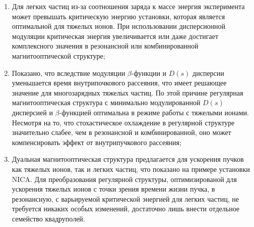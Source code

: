 \begin{enumerate}

\item  Для легких частиц из-за соотношения заряда к массе энергия эксперимента может превышать критическую энергию установки, которая является оптимальной для тяжелых ионов. При использовании дисперсионной модуляции критическая энергия увеличивается или даже достигает комплексного значения в резонансной или комбинированной магнитооптической структуре;

\item Показано, что вследствие модуляции $\beta$-функции и $D(s)$ дисперсии уменьшается время внутрипочкового рассеяния, что имеет решающее значение для многозарядных тяжелых частиц. По этой причине регулярная магнитооптическая структура с минимально модулированной $D(s)$ дисперсией и $\beta$-функцией оптимальна в режиме работы с тяжелыми ионами. Несмотря на то, что стохастическое охлаждение в регулярной структуре значительно слабее, чем в резонансной и комбинированной, оно может компенсировать эффект от внутрипучкового рассеяния;

\item Дуальная магнитооптическая структура предлагается для ускорения пучков как тяжелых ионов, так и легких частиц, что показано на примере установки NICA. Для преобразования регулярной структуры, оптимизированой для ускорения тяжелых ионов с точки зрения времени жизни пучка, в резонансную, с варьируемой критической энергией для легких частиц, не требуется никаких особых изменений, достаточно лишь внести отдельное семейство квадруполей.

\end{enumerate}

\FloatBarrier
